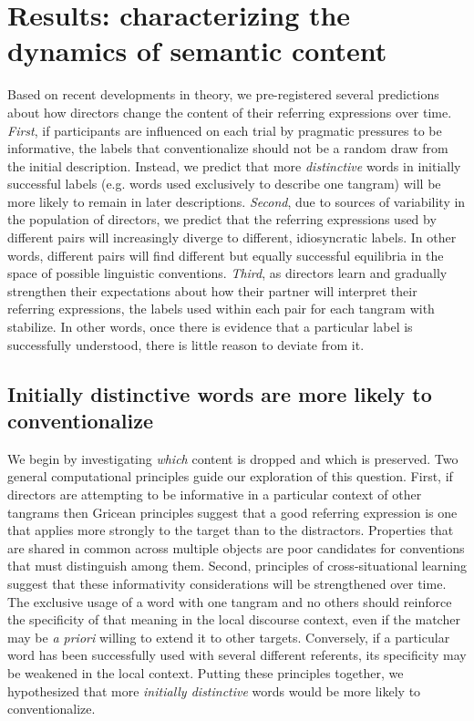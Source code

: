\documentclass[alpha-refs]{wiley-article}
\begin{document}

\section{Results: characterizing the dynamics of semantic content}
\label{sec:content} 

Based on recent developments in theory, we pre-registered several predictions about how directors change the content of their referring expressions over time.
\emph{First}, if participants are influenced on each trial by pragmatic pressures to be informative, the labels that conventionalize should not be a random draw from the initial description. 
Instead, we predict that more \emph{distinctive} words in initially successful labels (e.g. words used exclusively to describe one tangram) will be more likely to remain in later descriptions.
\emph{Second}, due to sources of variability in the population of directors, we predict that the referring expressions used by different pairs will increasingly diverge to different, idiosyncratic labels.
In other words, different pairs will find different but equally successful equilibria in the space of possible linguistic conventions.
\emph{Third}, as directors learn and gradually strengthen their expectations about how their partner will interpret their referring expressions, the labels used within each pair for each tangram with stabilize.
In other words, once there is evidence that a particular label is successfully understood, there is little reason to deviate from it.

\subsection{Initially distinctive words are more likely to conventionalize}
\label{sec:distinctive}

We begin by investigating \emph{which} content is dropped and which is preserved.
Two general computational principles guide our exploration of this question.
First, if directors are attempting to be informative in a particular context of other tangrams then Gricean principles suggest that a good referring expression is one that applies more strongly to the target than to the distractors. 
Properties that are shared in common across multiple objects are poor candidates for conventions that must distinguish among them.
Second, principles of cross-situational learning suggest that these informativity considerations will be strengthened over time.
The exclusive usage of a word with one tangram and no others should reinforce the specificity of that meaning in the local discourse context, even if the matcher may be \emph{a priori} willing to extend it to other targets.
Conversely, if a particular word has been successfully used with several different referents, its specificity may be weakened in the local context.
Putting these principles together, we hypothesized that more \emph{initially distinctive} words would be more likely to conventionalize.
\end{document}
